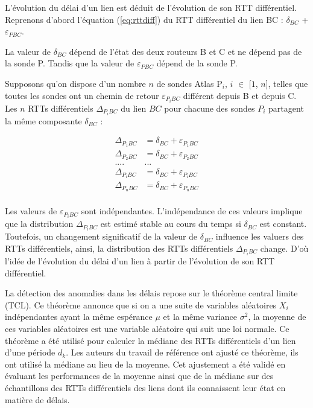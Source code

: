 L'évolution du délai d'un lien est déduit de l'évolution de son RTT différentiel. Reprenons d'abord l'équation (\ref{eq:rttdiff}) du RTT différentiel du lien BC :   $\delta_{BC}$ + $\varepsilon_{PBC}$. 
 
La valeur de  $\delta_{BC}$ dépend de l'état des deux routeurs B et C et ne dépend pas de la sonde P. Tandis que la valeur de $\varepsilon_{PBC}$ dépend de la sonde P.
 
 Supposons qu'on dispose d'un nombre $n$ de sondes Atlas P$_i$, $i$ $\in$ [$1$, $n$], telles que toutes les sondes ont un chemin de retour  $\varepsilon_{P_{i}BC}$ différent depuis B et depuis C.  Les $n$ RTTs différentiels $\Delta_{P{_i}BC}$ du lien $BC$ pour chacune des sondes $P_i$  partagent la même composante $\delta_{BC}$ :
 
 
 \begin{align*}
 \Delta_{P_{1}BC} &= \delta_{BC} + \varepsilon_{P_{1}BC}\\
  \Delta_{P_{2}BC} &= \delta_{BC} + \varepsilon_{P_{2}BC}\\
  .... &   ... \\
   \Delta_{P_{i}BC} &= \delta_{BC} + \varepsilon_{P_{i}BC}\\
      \Delta_{P_{n}BC} &= \delta_{BC} + \varepsilon_{P_{n}BC}\\
 \end{align*}
 
Les valeurs de  $\varepsilon_{P_{i}BC}$ sont  indépendantes. L'indépendance de ces valeurs implique que la distribution $\Delta_{P_{i}BC}$ est estimé  stable au cours du temps si $\delta_{BC}$ est constant. Toutefois, un changement significatif de la valeur de $\delta_{BC}$ influence les valuers des RTTs différentiels, ainsi,  la distribution des RTTs différentiels $\Delta_{P_{i}BC}$ change. D'où l'idée de l'évolution du délai d'un lien à partir de l'évolution de son RTT différentiel.


La détection des anomalies dans les délais repose sur le théorème  central limite (TCL). Ce théorème  annonce que si on a une suite de variables aléatoires $X_i$ indépendantes ayant la même espérance $\mu$ et la même variance $\sigma^2$, la moyenne de ces variables aléatoires est une variable aléatoire qui suit une loi normale. Ce théorème a été utilisé pour calculer la médiane des RTTs différentiels d'un lien d'une période $d_k$. Les auteurs du travail de référence ont ajusté ce théorème, ils ont utilisé la médiane au lieu de la moyenne. Cet ajustement  a été validé en évaluant les performances de la moyenne ainsi que de la médiane sur des échantillons des RTTs différentiels des liens  dont ils connaissent leur état en matière de délais.

